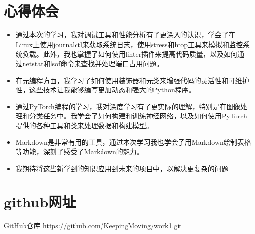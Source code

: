 \documentclass[UTF8]{ctexart}
\begin{document}
\section{心得体会}
 \begin{itemize} 
\item 通过本次的学习，我对调试工具和性能分析有了更深入的认识，学会了在Linux上使用journalctl来获取系统日志，使用stress和htop工具来模拟和监控系统负载。此外，我也掌握了如何使用linter插件来提高代码质量，以及如何通过netstat和lsof命令来查找并处理端口占用问题。 
\item 在元编程方面，我学习了如何使用装饰器和元类来增强代码的灵活性和可维护性，这些技术让我能够编写更加动态和强大的Python程序。
\item 通过PyTorch编程的学习，我对深度学习有了更实际的理解，特别是在图像处理和分类任务中。我学会了如何构建和训练神经网络，以及如何使用PyTorch提供的各种工具和类来处理数据和构建模型。
\item Markdown是非常有用的工具，通过本次学习我也学会了用Markdown绘制表格等功能，深刻了感受了Markdown的魅力。
\item 我期待将这些新学到的知识应用到未来的项目中，以解决更复杂的问题
\end{itemize}




  \section{github网址}
\href{https://github.com/KeepingMoving/work1.git}{GitHub仓库}
https://github.com/KeepingMoving/work1.git
 
\end{document}
